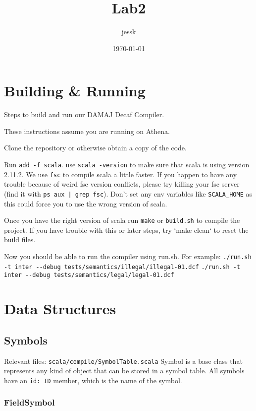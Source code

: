 \documentclass[11pt]{article}
\title{Lab2}
\author{jessk}
\date{\today}
\begin{document}
\maketitle

\setcounter{tocdepth}{3}
\tableofcontents
\vspace*{1cm}
\section{Building \& Running}
\label{sec-1}

  Steps to build and run our DAMAJ Decaf Compiler.
  
  These instructions assume you are running on Athena.
  
  Clone the repository or otherwise obtain a copy of the code.

  Run \verb~add -f scala~. use \verb~scala -version~ to make sure that scala is using version 2.11.2.
  We use \verb~fsc~ to compile scala a little faster. If you happen to have any trouble because of weird
  fsc version conflicts, please try killing your fsc server (find it with \verb~ps aux | grep fsc~).
  Don't set any env variables like \verb~SCALA_HOME~ as this could force you to use the wrong version
  of scala.
  
  Once you have the right version of scala run \verb~make~ or \verb~build.sh~ to compile the project.
  If you have trouble with this or later steps, try `make clean` to reset the build files.
  
  Now you should be able to run the compiler using run.sh.
  For example:
  \verb~./run.sh -t inter --debug tests/semantics/illegal/illegal-01.dcf~
  \verb~./run.sh -t inter --debug tests/semantics/legal/legal-01.dcf~
  
\section{Data Structures}
\label{sec-2}
\subsection{Symbols}
\label{sec-2-1}

   Relevant files: \verb~scala/compile/SymbolTable.scala~
   Symbol is a base class that represents any kind of object that can be stored in a symbol table.
   All symbols have an \verb~id: ID~ member, which is the name of the symbol.
\subsubsection{FieldSymbol}
\label{sec-2-1-1}
\end{document}
